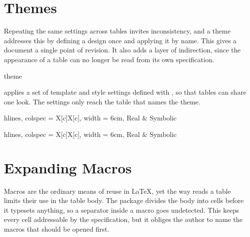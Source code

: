\section{Themes}\label{outer:themes}
Repeating the same settings across tables invites inconsistency, and a theme addresses this by defining a design once and applying it by name. This gives a document a single point of revision. It also adds a layer of indirection, since the appearance of a table can no longer be read from its own specification.

\begin{codedescribe}[
        key,
        new=2021L
    ]{theme}
    \begin{codesyntax}
    \end{codesyntax}
     applies a set of template and style settings defined with , so that tables can share one look. The settings only reach the table that names the theme.

    \begin{codestore}[st=outer:theme]
        \begin{talltblr}[
            theme = fancy,
            caption = {A table with a theme},
            note{a} = {Impossible.},
            ]{
            hlines, colspec = {X[c]X[c]}, width = 6cm,
            }
            Real & Symbolic
        \end{talltblr}\quad
        \begin{talltblr}[
            caption = {A table without one},
            note{a} = {Impossible.},
            ]{
            hlines, colspec = {X[c]X[c]}, width = 6cm,
            }
            Real & Symbolic
        \end{talltblr}\end{codestore}
    \begin{center}
    \end{center}
\end{codedescribe}

\section{Expanding Macros}\label{outer:expand}
Macros are the ordinary means of reuse in \LaTeX{}, yet the way  reads a table limits their use in the table body. The package divides the body into cells before it typesets anything, so a separator inside a macro goes undetected. This keeps every cell addressable by the specification, but it obliges the author to name the macros that should be opened first.

